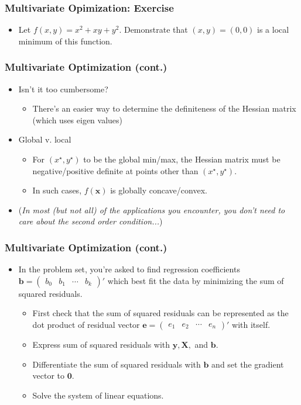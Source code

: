 \documentclass[pdflatex, 12pt]{beamer}
\begin{document}
\begin{frame}
\frametitle{Multivariate Opimization: Exercise}
\begin{itemize}
\item Let $f(x, y) = x^2 + xy + y^2$. Demonstrate that $(x, y) = (0, 0)$ is a local minimum of this function. 
\end{itemize}
\end{frame}

\begin{frame}
\frametitle{Multivariate Optimization (cont.)}
\begin{itemize}
\item Isn't it too cumbersome?
 \begin{itemize}
 \item There's an easier way to determine the definiteness of the Hessian matrix (which uses eigen values)
 \end{itemize}
\vspace{0.4cm}
\item Global v. local
 \begin{itemize}
 \item For $(x^{\star}, y^{\star})$ to be the global min/max, the Hessian matrix must be negative/positive definite at points other than $(x^{\star}, y^{\star})$.
 \item In such cases, $f(\bm{x})$ is globally concave/convex. 
 \end{itemize}
\vspace{0.4cm}
\item (\emph{In most (but not all) of the applications you encounter, you don't need to care about the second order condition...})
\end{itemize}
\end{frame}

\begin{frame}
\frametitle{Multivariate Optimization (cont.)}
\begin{itemize}
\item In the problem set, you're asked to find regression coefficients $\bm{b} = \begin{pmatrix}
b_0 & b_1 & \cdots & b_k
\end{pmatrix}'$ which best fit the data by minimizing the sum of squared residuals.
 \begin{itemize}
 \item First check that the sum of squared residuals can be represented as the dot product of residual vector $\bm{e} = \begin{pmatrix}
 e_1 & e_2 & \cdots & e_n
 \end{pmatrix}'$ with itself.
 \item Express sum of squared residuals with $\bm{y}, \bm{X}, $ and $\bm{b}$.
 \item Differentiate the sum of squared residuals with $\bm{b}$ and set the gradient vector to $\bm{0}$.
 \item Solve the system of linear equations. 
 \end{itemize}
\end{itemize}
\end{frame}
\end{document}
